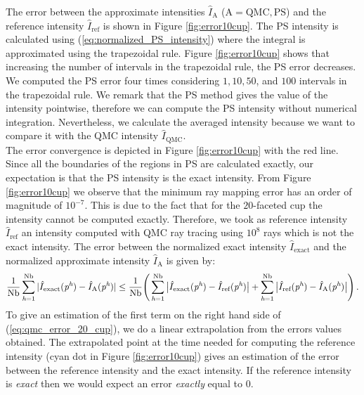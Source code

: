 The error between the approximate intensities $\hat{I}_{\textrm{A}}$ ($\textrm{A} = \textrm{QMC}, \textrm{PS}$) and the reference intensity $\hat{I}_{\textrm{ref}}$ is shown in Figure \ref{fig:error10cup}. 
The PS intensity is calculated using (\ref{eq:normalized_PS_intensity}) where the integral is approximated using the trapezoidal rule. Figure \ref{fig:error10cup} shows that increasing the number of intervals in the trapezoidal rule, the PS error decreases. We computed the PS error four times considering $1, 10, 50$, and $100$ intervals in the trapezoidal rule. 
We remark that the PS method gives the value of the intensity pointwise, therefore we can compute the PS intensity without numerical integration. Nevertheless, we calculate the averaged intensity because we want to compare it with the QMC intensity $\hat{I}_{\textrm{QMC}}$.
\\ \indent The error convergence is depicted in Figure \ref{fig:error10cup} with the red line.
Since all the boundaries of the regions in PS are calculated exactly, our expectation is that the PS intensity is the exact intensity.
From Figure \ref{fig:error10cup} we observe that the minimum ray mapping error has an order of magnitude of $10^{-7}$.
This is due to the fact that for the $20$-faceted cup the intensity cannot be computed exactly. 
Therefore, we took as reference intensity $\hat{I}_{\textrm{ref}}$ an intensity computed with QMC ray tracing using $10^8$ rays which is not the exact intensity.
The error between the normalized exact intensity $\hat{I}_{\textrm{exact}}$ and the normalized approximate intensity $\hat{I}_{\textrm{A}}$ is given by:
\begin{equation}\label{eq:qmc_error_20_cup}
\frac{1}{\textrm{Nb}}\sum_{\textit{h} = 1}^{\textrm{Nb}}| \hat{I}_{\textrm{exact}}(\textit{p}^{\textit{h}}) - \hat{I}_{\textrm{A}}(\textit{p}^{\textit{h}})| \leq
\frac{1}{\textrm{Nb}}\Bigg(\sum_{\textit{h} = 1}^{\textrm{Nb}}\big| \hat{I}_{\textrm{exact}}(\textit{p}^{\textit{h}}) - \hat{I}_{\textrm{ref}}(\textit{p}^{\textit{h}})\big| +
\sum_{\textit{h} = 1}^{\textrm{Nb}}\big| \hat{I}_{\textrm{ref}}(\textit{p}^{\textit{h}}) - \hat{I}_{\textrm{A}}(\textit{p}^{\textit{h}})\big|\Bigg)\,.
\end{equation}
To give an estimation of the first term on the right hand side of (\ref{eq:qmc_error_20_cup}), we do a linear extrapolation from the errors values obtained. The extrapolated point at the time needed for computing the reference intensity (cyan dot in Figure \ref{fig:error10cup}) gives an estimation of the error between the reference intensity and the exact intensity. If the reference intensity is \textit{exact} then we would expect an error \textit{exactly} equal to $0$.

